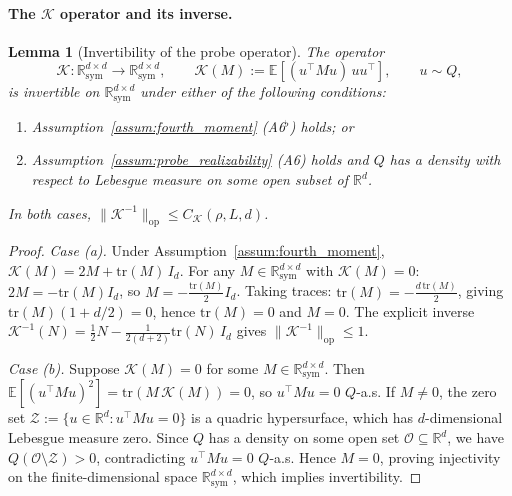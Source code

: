 \documentclass[12pt]{article}
\newcommand{\R}{\mathbb{R}}
\newcommand{\E}{\mathbb{E}}
\newcommand{\op}{\mathrm{op}}
\newcommand{\Rsy}{\mathbb{R}^{d\times d}_{\mathrm{sym}}}
\newcommand{\tr}{\mathrm{tr}}
\newtheorem{lemma}{Lemma}
\theoremstyle{plain}
\theoremstyle{definition}
\begin{document}
\paragraph{The $\mathcal{K}$ operator and its inverse.}

\begin{lemma}[Invertibility of the probe operator]
\label{lem:K_invertible}
The operator
\[
\mathcal{K} : \Rsy \to \Rsy,
\qquad
\mathcal{K}(M) := \E\!\left[(u^\top M u)\, uu^\top\right],
\qquad u \sim Q,
\]
is invertible on $\Rsy$ under either of the following conditions:
\begin{enumerate}[label=(\alph*),nosep]
\item Assumption~\ref{assum:fourth_moment} (A6$^\flat$) holds; or
\item Assumption~\ref{assum:probe_realizability} (A6) holds and $Q$ has a density with respect to Lebesgue measure on some open subset of $\R^d$.
\end{enumerate}
In both cases, $\|\mathcal{K}^{-1}\|_{\op} \le C_{\mathcal{K}}(\rho, L, d)$.
\end{lemma}

\begin{proof}
\emph{Case (a).}
Under Assumption~\ref{assum:fourth_moment}, $\mathcal{K}(M) = 2M + \tr(M)\, I_d$. For any $M \in \Rsy$ with $\mathcal{K}(M) = 0$: $2M = -\tr(M) I_d$, so $M = -\frac{\tr(M)}{2} I_d$. Taking traces: $\tr(M) = -\frac{d\, \tr(M)}{2}$, giving $\tr(M)(1 + d/2) = 0$, hence $\tr(M) = 0$ and $M = 0$. The explicit inverse $\mathcal{K}^{-1}(N) = \frac{1}{2}N - \frac{1}{2(d+2)}\tr(N)\, I_d$ gives $\|\mathcal{K}^{-1}\|_{\op} \le 1$.

\emph{Case (b).}
Suppose $\mathcal{K}(M) = 0$ for some $M \in \Rsy$. Then $\E[(u^\top M u)^2] = \tr(M\, \mathcal{K}(M)) = 0$, so $u^\top M u = 0$ $Q$-a.s. If $M \neq 0$, the zero set $\mathcal{Z} := \{u \in \R^d : u^\top M u = 0\}$ is a quadric hypersurface, which has $d$-dimensional Lebesgue measure zero. Since $Q$ has a density on some open set $\mathcal{O} \subseteq \R^d$, we have $Q(\mathcal{O} \setminus \mathcal{Z}) > 0$, contradicting $u^\top M u = 0$ $Q$-a.s. Hence $M = 0$, proving injectivity on the finite-dimensional space $\Rsy$, which implies invertibility.
\end{proof}
\end{document}
